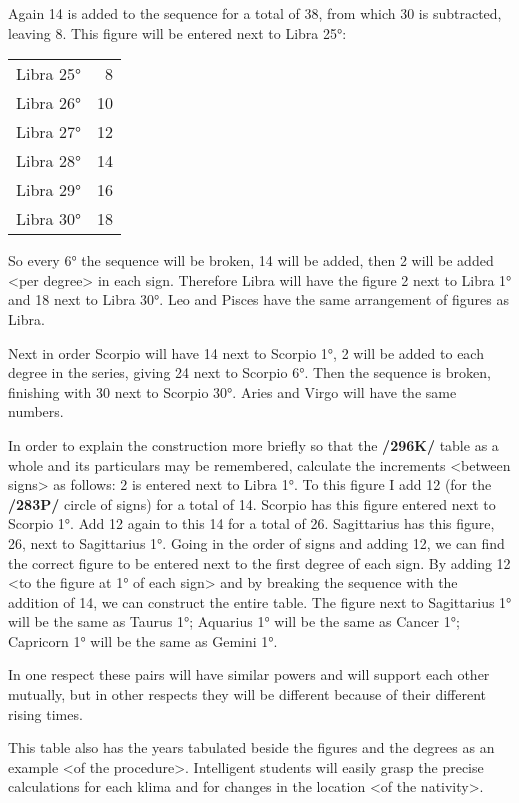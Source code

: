 Again 14 is added to the sequence for a total of 38, from which 30 is subtracted, leaving 8. This figure will be entered next to Libra 25°:

\begin{tabular}{lr}
Libra 25° & 8 \\
Libra 26° & 10 \\ 
Libra 27° & 12 \\
Libra 28° & 14 \\ 
Libra 29° & 16 \\ 
Libra 30° & 18 \\
\end{tabular}

So every 6° the sequence will be broken, 14 will be added, then 2 will be added <per degree> in each sign. Therefore Libra will have the figure 2 next to Libra 1° and 18 next to Libra 30°. Leo and Pisces have the same arrangement of figures as Libra.

Next in order Scorpio will have 14 next to Scorpio 1°, 2 will be added to each degree in the series, giving 24 next to Scorpio 6°. Then the sequence is broken, finishing with 30 next to Scorpio 30°. Aries and Virgo will have the same numbers.

In order to explain the construction more briefly so that the \textbf{/296K/} table as a whole and its particulars may be remembered, calculate the increments <between signs> as follows: 2 is entered next to Libra 1°. To this figure I add 12 (for the \textbf{/283P/} circle of signs) for a total of 14. Scorpio has this figure entered next to Scorpio 1°. Add 12 again to this 14 for a total of 26. Sagittarius has this figure, 26, next to Sagittarius 1°. Going in the order of signs and adding 12, we can find the correct figure to be entered next to the first degree of each sign. By adding 12 <to the figure at 1° of each sign> and by breaking the sequence with the addition of 14, we can construct the entire table. The figure next to Sagittarius 1° will be the same as
Taurus 1°; Aquarius 1° will be the same as Cancer 1°; Capricorn 1° will be the same as Gemini 1°. 

In one respect these pairs will have similar powers and will support each other mutually, but in other respects they will be different because of their different rising times. 

This table also has the years tabulated beside the figures and the degrees as an example <of the procedure>. Intelligent students will easily grasp the precise calculations for each klima and for changes in the location <of the nativity>.

\newpage